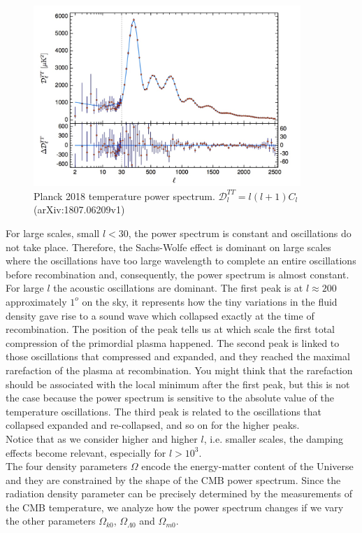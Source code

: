 \documentclass{article}
\begin{document}
\begin{figure}
\centering
\includegraphics[width=0.9\textwidth]{planck2018}
\caption{Planck 2018 temperature power spectrum. $\mathcal{D}^{TT}_l = l(l+1)C_l$ (arXiv:1807.06209v1)}
\label{temp_pow_spect}
\end{figure}
%
%
%
For large scales, small $l<30$, the power spectrum is constant and oscillations do not take place.
Therefore, the Sachs-Wolfe effect is dominant on large scales where the oscillations have too large wavelength to complete an entire oscillations before recombination and, consequently, the power spectrum is almost constant.\\
For large $l$ the acoustic oscillations are dominant.
The first peak is at $l \approx 200$ approximately $1 ^o$ on the sky, it represents how the tiny variations in the fluid density gave rise to a sound wave which collapsed exactly at the time of recombination.
The position of the peak tells us at which scale the first total compression of the primordial plasma happened.
The second peak is linked to those oscillations that compressed and expanded, and they reached the maximal rarefaction of the plasma at recombination.
You might think that the rarefaction should be associated with the local minimum after the first peak, but this is not the case because the power spectrum is sensitive to the absolute value of the temperature oscillations.
The third peak is related to the oscillations that collapsed expanded and re-collapsed, and so on for the higher peaks.\\
Notice that as we consider higher and higher $l$, i.e. smaller scales, the damping effects become relevant, especially for  $l>10^{3}$.\\
The four density parameters $\Omega$ encode the energy-matter content of the Universe and they are constrained by the shape of the CMB power spectrum.
Since the radiation density parameter can be precisely determined by the measurements of the CMB temperature, we analyze how the power spectrum changes if we vary the other  parameters $\Omega _{k 0}$, $\Omega _{\Lambda 0}$ and $\Omega _{m 0}$.
\end{document}
